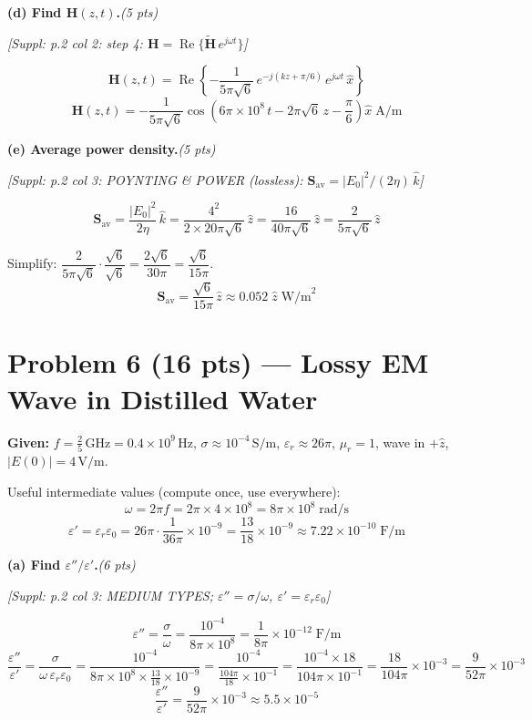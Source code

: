 \documentclass[11pt,letterpaper]{article}
\newcommand{\refbox}[1]{\textcolor{ref}{\textit{[Suppl: #1]}}}
\newcommand{\ptag}[1]{\hfill\textit{(#1 pts)}}
\begin{document}
\medskip

\textbf{(d) Find $\mathbf{H}(z,t)$.}\ptag{5}

\refbox{p.2 col 2: step 4: $\mathbf{H}=\operatorname{Re}\{\tilde{\mathbf{H}}\,e^{j\omega t}\}$}

\[
\mathbf{H}(z,t) = \operatorname{Re}\!\left\{-\frac{1}{5\pi\sqrt{6}}\,e^{-j(kz+\pi/6)}\,e^{j\omega t}\,\hat{x}\right\}
\]
\[
\boxed{\mathbf{H}(z,t)
= -\frac{1}{5\pi\sqrt{6}}\cos\!\left(6\pi\times10^8\,t - 2\pi\sqrt{6}\,z - \frac{\pi}{6}\right)\hat{x}\;\text{A/m}}
\]

\medskip

\textbf{(e) Average power density.}\ptag{5}

\refbox{p.2 col 3: POYNTING \& POWER (lossless): $\mathbf{S}_\text{av}=|E_0|^2/(2\eta)\,\hat{k}$}

\[
\mathbf{S}_\text{av} = \frac{|E_0|^2}{2\eta}\,\hat{k}
= \frac{4^2}{2\times 20\pi\sqrt{6}}\,\hat{z}
= \frac{16}{40\pi\sqrt{6}}\,\hat{z}
= \frac{2}{5\pi\sqrt{6}}\,\hat{z}
\]

Simplify: $\dfrac{2}{5\pi\sqrt{6}}\cdot\dfrac{\sqrt{6}}{\sqrt{6}}=\dfrac{2\sqrt{6}}{30\pi}=\dfrac{\sqrt{6}}{15\pi}$.
\[
\boxed{\mathbf{S}_\text{av} = \frac{\sqrt{6}}{15\pi}\,\hat{z}\approx 0.052\;\hat{z}\;\text{W/m}^2}
\]

\section*{Problem 6 (16 pts) --- Lossy EM Wave in Distilled Water}

\textbf{Given:} $f=\tfrac{2}{5}\,\text{GHz}=0.4\times10^9\,\text{Hz}$, $\sigma\approx10^{-4}\,\text{S/m}$,
$\varepsilon_r\approx26\pi$, $\mu_r=1$, wave in $+\hat{z}$, $|E(0)|=4\,\text{V/m}$.

Useful intermediate values (compute once, use everywhere):
\[
\omega = 2\pi f = 2\pi\times4\times10^8 = 8\pi\times10^8\;\text{rad/s}
\]
\[
\varepsilon' = \varepsilon_r\varepsilon_0
= 26\pi\cdot\frac{1}{36\pi}\times10^{-9}
= \frac{13}{18}\times10^{-9}\approx7.22\times10^{-10}\;\text{F/m}
\]

\medskip

\textbf{(a) Find $\varepsilon''/\varepsilon'$.}\ptag{6}

\refbox{p.2 col 3: MEDIUM TYPES; $\varepsilon''=\sigma/\omega$, $\varepsilon'=\varepsilon_r\varepsilon_0$}

\[
\varepsilon'' = \frac{\sigma}{\omega} = \frac{10^{-4}}{8\pi\times10^8}
= \frac{1}{8\pi}\times10^{-12}\;\text{F/m}
\]
\[
\frac{\varepsilon''}{\varepsilon'} = \frac{\sigma}{\omega\,\varepsilon_r\varepsilon_0}
= \frac{10^{-4}}{8\pi\times10^8\times\frac{13}{18}\times10^{-9}}
= \frac{10^{-4}}{\frac{104\pi}{18}\times10^{-1}}
= \frac{10^{-4}\times18}{104\pi\times10^{-1}}
= \frac{18}{104\pi}\times10^{-3}
= \frac{9}{52\pi}\times10^{-3}
\]
\[
\boxed{\frac{\varepsilon''}{\varepsilon'} = \frac{9}{52\pi}\times10^{-3}\approx 5.5\times10^{-5}}
\]
\end{document}
